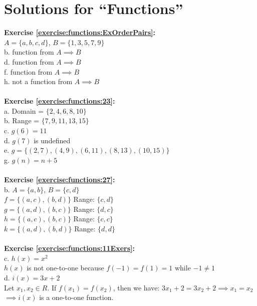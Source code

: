 \section{Solutions for ``Functions''}
\noindent{}\bigskip

\textbf{Exercise \ref{exercise:functions:ExOrderPairs}:}\\
$A=\{a,b,c,d\}$, $B=\{1,3,5,7,9\}$\\
b. function from $A \implies B$\\
d. function from $A \implies B$\\
f. function from $A \implies B$\\
h. not a function from $A \implies B$\\
\\
\textbf{Exercise \ref{exercise:functions:23}:}\\
a. Domain = $\{2,4,6,8,10\}$\\
b. Range = $\{7,9,11,13,15\}$\\
c. $g(6)=11$\\
d. $g(7)$ is undefined\\
e. $g=\{(2,7),(4,9),(6,11),(8,13),(10,15)\}$\\
g. $g(n)=n+5$\\
\\
\textbf{Exercise \ref{exercise:functions:27}:}\\
b. $A=\{a,b\}$, $B=\{c,d\}$\\
$f=\{(a,c),(b,d)\}$ Range: $\{c,d\}$\\
$g=\{(a,d),(b,c)\}$ Range: $\{d,c\}$\\
$h=\{(a,c),(b,c)\}$ Range: $\{c,c\}$\\
$k=\{(a,d),(b,d)\}$ Range: $\{d,d\}$\\
\\
\textbf{Exercise \ref{exercise:functions:11Exers}:}\\
c. $h(x)=x^2$\\
$h(x)$ is not one-to-one because $f(-1)=f(1)=1$ while $-1\neq 1$\\
d. $i(x)=3x+2$\\
Let $x_1,x_2 \in R$. If $f(x_1)=f(x_2)$, then we have:
$3x_1+2=3x_2+2 \implies x_1=x_2$\\
$\implies i(x)$ is a one-to-one function.\\
\\
